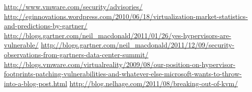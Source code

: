 {}
\begin{thebibliography}{99}
 \url{http://www.vmware.com/security/advisories/}
\bibitem{} \url{http://eginnovations.wordpress.com/2010/06/18/virtualization-market-statistics-and-predictions-by-gartner/}
 \url{http://blogs.gartner.com/neil\_macdonald/2011/01/26/yes-hypervisors-are-vulnerable/}
\bibitem{}
\url{http://blogs.gartner.com/neil\_macdonald/2011/12/09/security-observations-from-gartners-data-center-summit/}
 \url{http://blogs.vmware.com/virtualreality/2009/08/our-position-on-hypervisor-footprints-patching-vulnerabilities-and-whatever-else-microsoft-wants-to-throw-into-a-blog-post.html}
 \url{http://blog.nelhage.com/2011/08/breaking-out-of-kvm/}
\end{thebibliography}
